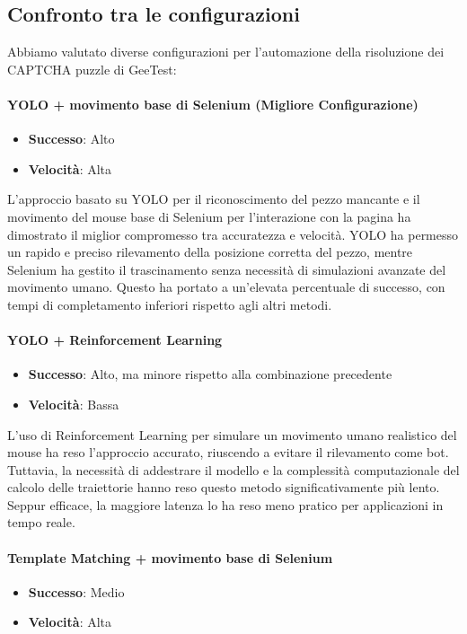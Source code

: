 \documentclass{article}
\begin{document}
\subsection{Confronto tra le configurazioni}
Abbiamo valutato diverse configurazioni per l'automazione della risoluzione dei CAPTCHA puzzle di GeeTest:

\paragraph{YOLO + movimento base di Selenium (Migliore Configurazione)}
\begin{itemize}
    \item \textbf{Successo}: Alto
    \item \textbf{Velocità}: Alta
\end{itemize}

L’approccio basato su YOLO per il riconoscimento del pezzo mancante e il movimento del mouse base di Selenium per l’interazione con la pagina ha dimostrato il miglior compromesso tra accuratezza e velocità. YOLO ha permesso un rapido e preciso rilevamento della posizione corretta del pezzo, mentre Selenium ha gestito il trascinamento senza necessità di simulazioni avanzate del movimento umano. Questo ha portato a un’elevata percentuale di successo, con tempi di completamento inferiori rispetto agli altri metodi.

\paragraph{YOLO + Reinforcement Learning}
\begin{itemize}
    \item \textbf{Successo}: Alto, ma minore rispetto alla combinazione precedente
    \item \textbf{Velocità}: Bassa
\end{itemize}

L'uso di Reinforcement Learning per simulare un movimento umano realistico del mouse ha reso l’approccio accurato, riuscendo a evitare il rilevamento come bot. Tuttavia, la necessità di addestrare il modello e la complessità computazionale del calcolo delle traiettorie hanno reso questo metodo significativamente più lento. Seppur efficace, la maggiore latenza lo ha reso meno pratico per applicazioni in tempo reale.

\paragraph{Template Matching + movimento base di Selenium}
\begin{itemize}
    \item \textbf{Successo}: Medio
    \item \textbf{Velocità}: Alta
\end{itemize}
\end{document}
